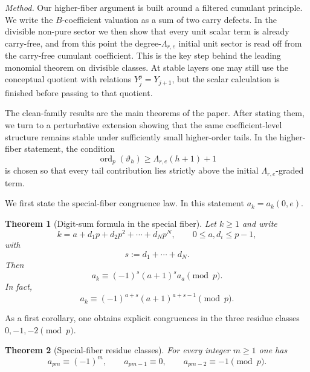 \documentclass[11pt]{amsart}
\numberwithin{equation}{section}
\newtheorem{theorem}{Theorem}[section]
\DeclareMathOperator{\ordop}{ord}
\newcommand{\vp}{\ordop_p}
\begin{document}
\medskip
\noindent\emph{Method.}
Our higher-fiber argument is built around a filtered cumulant principle.  We write the $B$-coefficient valuation as a sum of two carry defects.  In the divisible non-pure sector we then show that every unit scalar term is already carry-free, and from this point the degree-$\Lambda_{r,e}$ initial unit sector is read off from the carry-free cumulant coefficient.  This is the key step behind the leading monomial theorem on divisible classes.  At stable layers one may still use the conceptual quotient with relations $Y_j^p=Y_{j+1}$, but the scalar calculation is finished before passing to that quotient.

The clean-family results are the main theorems of the paper.  After stating them, we turn to a perturbative extension showing that the same coefficient-level structure remains stable under sufficiently small higher-order tails.  In the higher-fiber statement, the condition
\[
        \vp(\vartheta_h)\ge \Lambda_{r,e}(h+1)+1
\]
is chosen so that every tail contribution lies strictly above the initial $\Lambda_{r,e}$-graded term.

We first state the special-fiber congruence law.  In this statement $a_k=a_k(0,e)$.

\begin{theorem}[Digit-sum formula in the special fiber]\label{thm:digit-sum}
Let $k\ge 1$ and write
\[
        k=a+d_1p+d_2p^2+\cdots+d_Np^N,
        \qquad 0\le a,d_i\le p-1,
\]
with
\[
        s:=d_1+\cdots+d_N.
\]
Then
\begin{equation}\label{eq:digit-formula-aa}
        a_k\equiv (-1)^s(a+1)^s a_a \pmod p.
\end{equation}
In fact,
\begin{equation}\label{eq:closed-digit-formula}
        a_k\equiv (-1)^{a+s}(a+1)^{a+s-1}\pmod p.
\end{equation}
\end{theorem}

As a first corollary, one obtains explicit congruences in the three residue classes $0,-1,-2\pmod p$.

\begin{theorem}[Special-fiber residue classes]\label{thm:SS-special}
For every integer $m\ge 1$ one has
\[
        a_{pm}\equiv (-1)^m,
        \qquad
        a_{pm-1}\equiv 0,
        \qquad
        a_{pm-2}\equiv -1\pmod p.
\]
\end{theorem}
\end{document}
